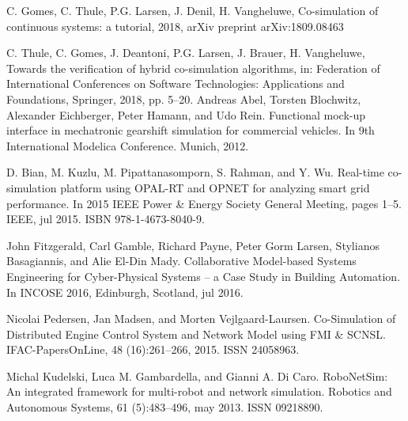 
\begin{thebibliography}{1} 
    
   C. Gomes, C. Thule, P.G. Larsen, J. Denil, H. Vangheluwe, Co-simulation of continuous systems: a tutorial, 2018, arXiv preprint arXiv:1809.08463

    C. Thule, C. Gomes, J. Deantoni, P.G. Larsen, J. Brauer, H. Vangheluwe, Towards the verification of hybrid co-simulation algorithms, in: Federation of
International Conferences on Software Technologies: Applications and Foundations, Springer, 2018, pp. 5–20.
   Andreas Abel, Torsten Blochwitz, Alexander Eichberger, Peter Hamann, and Udo Rein. Functional mock-up interface in mechatronic gearshift simulation for commercial vehicles. In 9th International Modelica Conference. Munich, 2012.
  
   D. Bian, M. Kuzlu, M. Pipattanasomporn, S. Rahman, and Y. Wu. Real-time co-simulation platform using OPAL-RT and OPNET for analyzing smart grid performance. In 2015 IEEE Power \& Energy Society General Meeting, pages 1–5. IEEE, jul 2015. ISBN 978-1-4673-8040-9.
  
   John Fitzgerald, Carl Gamble, Richard Payne, Peter Gorm Larsen, Stylianos Basagiannis, and Alie El-Din Mady. Collaborative Model-based Systems Engineering for Cyber-Physical Systems – a Case Study in Building Automation. In INCOSE 2016, Edinburgh, Scotland, jul 2016.
  
   Nicolai Pedersen, Jan Madsen, and Morten Vejlgaard-Laursen. Co-Simulation of Distributed Engine Control System and Network Model using FMI \& SCNSL. IFAC-PapersOnLine, 48 (16):261–266, 2015. ISSN 24058963.
  
   Michal Kudelski, Luca M. Gambardella, and Gianni A. Di Caro. RoboNetSim: An integrated framework for multi-robot and network simulation. Robotics and Autonomous Systems, 61 (5):483–496, may 2013. ISSN 09218890.
  

\end{thebibliography}
